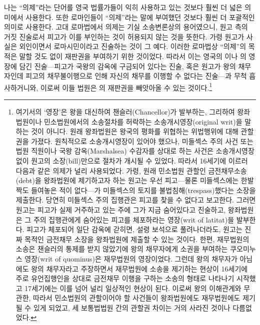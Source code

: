 나는 ``의제''라는 단어를 영국 법률가들이 익히 사용하고 있는 것보다
훨씬 더 넓은 의미에서 사용한다. 또한 로마인들이 ``의제''라는
말에 부여했던 것보다 훨씬 더 포괄적인 의미로 사용한다.
고대 로마법에서 의제는 기실 소송변론상의 용어였으니,
원고 측의 거짓 진술로서 피고가 이를 부인하는 것이 허용되지 않는 것을 뜻한다.
가령 원고가 사실은 외인이면서 로마시민이라고 진술하는 것이 그 예다.
이러한 로마법상 ``의제''의 목적은 말할 것도 없이 재판권을 부여하기 위한
것이었다.
\label{commonlawfiction}%
따라서 이는 영국의 이나
의 영장에 담긴
진술---피고가 국왕의 감옥에 구금되어 있다는 진술, 혹은
원고가 왕의 채무자인데 피고의 채무불이행으로 인해
자신의 채무를 이행할 수 없다는
진술---과 무척 흡사하거니와,
이로써 이들 법원은 의 재판권을 빼앗아올 수 있는
것이다.\footnote{%
  여기서의 `영장'은 왕을 대신하여 챈슬러(Chancellor)가 발부하는,
  그리하여 왕좌법원이나 민소법원에서의 소송절차를 허락하는
  소송개시영장(original writ)을 말하는 것이 아니다.
  원래 왕좌법원은 왕국의 평화를 위협하는 위법행위에 대해 관할권을 가졌다.
  원칙적으로 소송개시영장이 있어야 했으나, 미들섹스 주의 사건 또는
  법원 직원이나 국왕 감옥(Marshalsea) 수감자를 상대로 하는 사건은
  소송개시영장 없이 원고의 소장(bill)만으로 절차가 개시될 수 있었다.
  따라서 16세기에 이르러 다음과 같은 의제가 널리 사용되었다.
  가령, 원래 민소법원 관할인 금전채무소송(debt)을 왕좌법원에 제기하고자 하는
  원고는 우선 피고---물론 미들섹스에는 한발짝도 들여놓은 적이 없다---가
  미들섹스의 토지를 불법침해(trespass)했다는 소장을 제출한다.
  당연히 미들섹스 주의 집행관은 피고를 찾을 수 없다고 보고한다.
  그러면 원고는 피고가 실제 거주하고 있는 주에 그가 지금 숨어있다고 진술하고,
  왕좌법원은 그 주의 집행관에게 숨어있는 피고를 체포하라는
  영장(writ of latitat)을 발부한다.
  피고가 체포되어 일단 감옥에 갇히면, 설령 보석으로 풀려나더라도,
  원고는 진짜 목적인 금전채무 소장을 왕좌법원에 제출할 수 있는 것이다.
  한편, 재무법원의 소송은 챈슬러의 통제를 받지 않았기에
  왕의 채무자에게 소권을 부여하는 쿠오미누스 영장(writ of quominus)은
  재무법원의 영장이었다.
  그런데 왕의 채무자가 아님에도 왕의 채무자라고 주장하면서
  재무법원에 소송을 제기하는 현상이 16세기에 주로
  유언집행인을 상대로 금전채무 이행을 구하는 소송의 형태로
  나타나기 시작했고 17세기에는 이를 넘어 널리 일상적인 현상이 된다.
  이로써 왕의 이해관계와 무관한, 따라서 민소법원의 관할이어야 할 사건들이
  왕좌법원에도 재무법원에도 제기될 수 있게 되었고, 세 보통법법원 간의
  관할권 차이는 거의 사라진 것이나 다름없었다.
}
